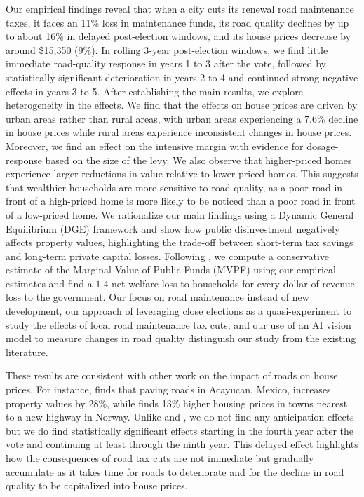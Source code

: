 Our empirical findings reveal that when a city cuts its renewal road maintenance taxes, it faces an 11\% loss in maintenance funds, its road quality declines by up to about 16\% in delayed post-election windows, and its house prices decrease by around \$15,350 (9\%). In rolling 3-year post-election windows, we find little immediate road-quality response in years 1 to 3 after the vote, followed by statistically significant deterioration in years 2 to 4 and continued strong negative effects in years 3 to 5. After establishing the main results, we explore heterogeneity in the effects. We find that the effects on house prices are driven by urban areas rather than rural areas, with urban areas experiencing a 7.6\% decline in house prices while rural areas experience inconsistent changes in house prices. Moreover, we find an effect on the intensive margin with evidence for dosage-response based on the size of the levy. We also observe that higher-priced homes experience larger reductions in value relative to lower-priced homes. This suggests that wealthier households are more sensitive to road quality, as a poor road in front of a high-priced home is more likely to be noticed than a poor road in front of a low-priced home. We rationalize our main findings using a Dynamic General Equilibrium (DGE) framework and show how public disinvestment negatively affects property values, highlighting the trade-off between short-term tax savings and long-term private capital losses. Following \cite{hendren2020unified}, we compute a conservative estimate of the Marginal Value of Public Funds (MVPF) using our empirical estimates and find a $1.4$ net welfare loss to households for every dollar of revenue loss to the government. Our focus on road maintenance instead of new development, our approach of leveraging close elections as a quasi-experiment to study the effects of local road maintenance tax cuts, and our use of an AI vision model to measure changes in road quality distinguish our study from the existing literature.

These results are consistent with other work on the impact of roads on house prices. For instance, \cite{gonzalez2016paving} finds that paving roads in Acayucan, Mexico, increases property values by 28\%, while \cite{theisen2021road} finds 13\% higher housing prices in towns nearest to a new highway in Norway.
Unlike \cite{beenstock2016hedonic} and \cite{diao2017spatial}, we do not find any anticipation effects but we do find statistically significant effects starting in the fourth year after the vote and continuing at least through the ninth year. This delayed effect highlights how the consequences of road tax cuts are not immediate but gradually accumulate as it takes time for roads to deteriorate and for the decline in road quality to be capitalized into house prices.

